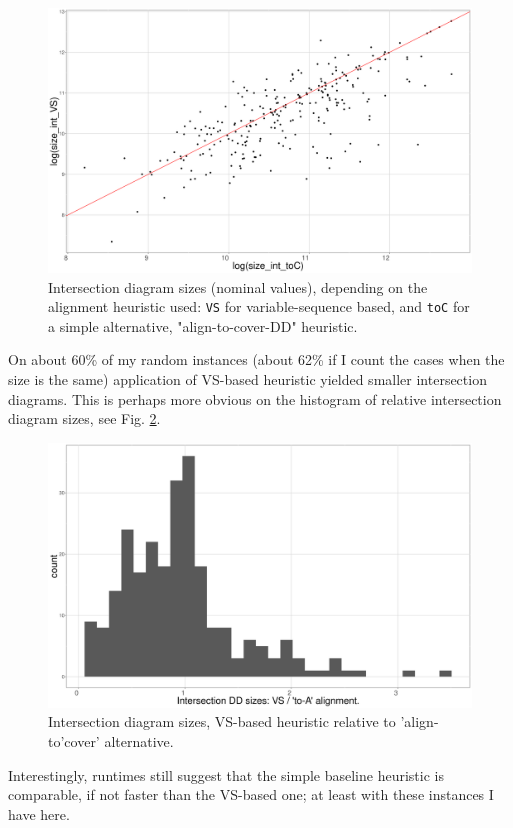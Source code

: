 \documentclass[11pt]{article}
\begin{document}
\begin{figure}[htbp]
\centering
\includegraphics[width=0.8\linewidth]{./int_sizes_points.png}
\caption{\label{fig:intrndpts}Intersection diagram sizes (nominal values), depending on the alignment heuristic used: \texttt{VS} for variable-sequence based, and \texttt{toC} for a simple alternative, "align-to-cover-DD" heuristic.}
\end{figure}

On about 60\% of my random instances (about 62\% if I count the cases when the
size is the same) application of VS-based heuristic yielded smaller intersection
diagrams. This is perhaps more obvious on the histogram of relative intersection
diagram sizes, see Fig. \ref{fig:intrndhist}.

\begin{figure}[htbp]
\centering
\includegraphics[width=0.8\linewidth]{./int_sizes_hist.png}
\caption{\label{fig:intrndhist}Intersection diagram sizes, VS-based heuristic relative to 'align-to'cover' alternative.}
\end{figure}

Interestingly, runtimes still suggest that the simple baseline heuristic is
comparable, if not faster than the VS-based one; at least with these instances I
have here.
\end{document}
